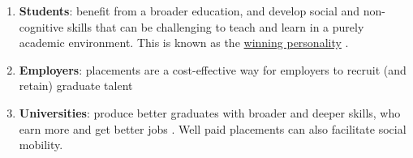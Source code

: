 \documentclass[
  12pt,
]{book}
\providecommand{\tightlist}{%
  \setlength{\itemsep}{0pt}\setlength{\parskip}{0pt}}
\begin{document}
\begin{enumerate}
\def\labelenumi{\arabic{enumi}.}
\tightlist
\item
  \textbf{Students}: benefit from a broader education, and develop social and non-cognitive skills that can be challenging to teach and learn in a purely academic environment. This is known as the \href{https://www.suttontrust.com/research-paper/a-winning-personality-confidence-aspirations-social-mobility/}{winning personality} \citep{winningpersonality}.
\item
  \textbf{Employers}: placements are a cost-effective way for employers to recruit (and retain) graduate talent
\item
  \textbf{Universities}: produce better graduates \citep{Mandilaras2004} with broader and deeper skills, who earn more and get better jobs \citep{winningpersonality}. Well paid placements can also facilitate social mobility. \citep{Wang2018}
\end{enumerate}
\end{document}
